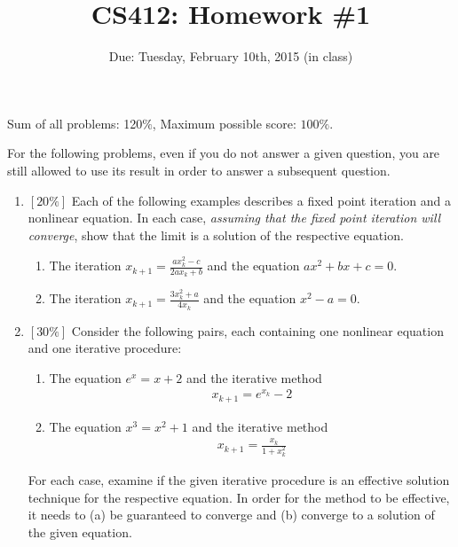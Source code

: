 \documentclass{article}
\author{}
\title{CS412: Homework \#1}
\author{Due: Tuesday, February 10th, 2015 (in class)}
\date{}
\begin{document}
\maketitle

\noindent Sum of all problems: 120$\%$, Maximum possible score: $100\%$.
\vspace{.2in}

\noindent For the following problems, even if you do not answer a given
question, you are still allowed to use its result in order to answer a
subsequent question.

\begin{enumerate}
\item
$[20\%]$ Each of the following examples describes a fixed point iteration and a nonlinear
equation. In each case, \emph{assuming that the fixed point iteration will
converge}, show that the limit is a solution of the respective equation.
\begin{enumerate}
\item
The iteration $x_{k+1}=\frac{ax_k^2-c}{2ax_k+b}$ and the equation $ax^2+bx+c=0$.
\item
The iteration $x_{k+1}=\frac{3x_k^2+a}{4x_k}$ and the equation $x^2-a=0$.
\end{enumerate}

\item
$[30\%]$ Consider the following pairs, each containing one nonlinear equation and
one iterative procedure:
\begin{enumerate}
\item
The equation $e^x=x+2$ and the iterative method
\begin{eqnarray*}
x_{k+1}=e^{x_k}-2
\end{eqnarray*}
\item
The equation $x^3=x^2+1$ and the iterative method
\begin{eqnarray*}
x_{k+1}=\frac{x_k}{1+x_k^2}
\end{eqnarray*}
\end{enumerate}
For each case, examine if the given iterative procedure is an effective solution
technique for the respective equation. In order for the method to be effective,
it needs to (a) be guaranteed to converge and (b) converge to a solution of the
given equation.


\end{enumerate}
\end{document}
